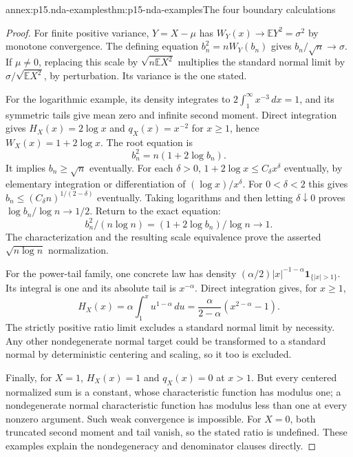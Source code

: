 \begin{annexitem}{annex:p15.nda-examples}{thm:p15-nda-examples}{The four boundary calculations}
\begin{proof}
For finite positive variance, \(Y=X-\mu\) has
\(W_Y(x)\to\mathbb EY^2=\sigma^2\) by monotone convergence.
The defining equation \(b_n^2=nW_Y(b_n)\) gives
\(b_n/\sqrt n\to\sigma\).
If \(\mu\ne0\), replacing this scale by
\(\sqrt{n\mathbb EX^2}\) multiplies the standard normal limit
by \(\sigma/\sqrt{\mathbb EX^2}\), by perturbation.
Its variance is the one stated.

For the logarithmic example, its density integrates to
\(2\int_1^\infty x^{-3}\,dx=1\), and its symmetric tails
give mean zero and infinite second moment.
Direct integration gives \(H_X(x)=2\log x\) and
\(q_X(x)=x^{-2}\) for \(x\geq1\), hence
\(W_X(x)=1+2\log x\). The root equation is
\[
 b_n^2=n(1+2\log b_n).
 \]
It implies \(b_n\geq\sqrt n\) eventually.
For each \(\delta>0\), \(1+2\log x\leq C_\delta x^\delta\)
eventually, by elementary integration or differentiation of
\((\log x)/x^\delta\). For \(0<\delta<2\) this gives
\(b_n\leq(C_\delta n)^{1/(2-\delta)}\) eventually.
Taking logarithms and then letting \(\delta\downarrow0\)
proves \(\log b_n/\log n\to1/2\).
Return to the exact equation:
\[
 b_n^2/(n\log n)
       =(1+2\log b_n)/\log n\to1.
 \]
The characterization and the resulting scale equivalence prove
the asserted \(\sqrt{n\log n}\) normalization.

For the power-tail family, one concrete law has density
\((\alpha/2)|x|^{-1-\alpha}\mathbf1_{\{|x|>1\}}\).
Its integral is one and its absolute tail is \(x^{-\alpha}\).
Direct integration gives, for \(x\geq1\),
\[
 H_X(x)=\alpha\int_1^x u^{1-\alpha}\,du
                  =\frac{\alpha}{2-\alpha}(x^{2-\alpha}-1).
 \]
The strictly positive ratio limit excludes a standard normal
limit by necessity. Any other nondegenerate normal target
could be transformed to a standard normal by deterministic
centering and scaling, so it too is excluded.

Finally, for \(X=1\), \(H_X(x)=1\) and \(q_X(x)=0\) at \(x>1\).
But every centered normalized sum is a constant, whose
characteristic function has modulus one; a nondegenerate
normal characteristic function has modulus less than one at
every nonzero argument. Such weak convergence is impossible.
For \(X=0\), both truncated second moment and tail vanish,
so the stated ratio is undefined. These examples explain the
nondegeneracy and denominator clauses directly.
\end{proof}
\end{annexitem}
